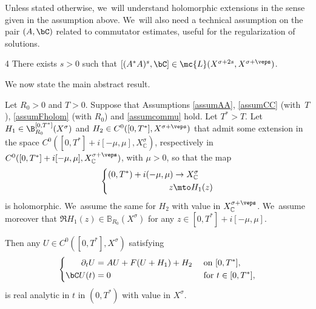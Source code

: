 Unless stated otherwise, we~will understand holomorphic extensions in the sense given in the assumption above. We~will also need a technical assumption on the pair $(A, \bC)$ related to commutator estimates, useful for the regularization of solutions.
\begin{assump}{4}
\label{assumcommu}
There exists $s>0$ such that $[(A^*A)^s,\bC]\in \mc{L}(X^{\sigma+2s}, X^{\sigma+\veps})$.
\end{assump}

We now state the main abstract result.

\begin{theorem}\label{thmabstractanalyticintro}
Let $R_{0}\!>\!0$ and $T\!>\!0$. Suppose that Assumptions \ref{assumAA}, \ref{assumCC} (with~$T$), \ref{assumFholom} (with $R_{0}$) and \ref{assumcommu} hold. Let $T^{*}\!>\!T$. Let $H_{1}\in \B_{R_{0}}^{[0,T^{*}]}(X^{\sigma})$ and $H_{2}\in C^{0}([0,T^{*}],X^{\sigma+\veps})$ that admit some extension in the space $C^{0}([0,T^{*}]+i[-\mu,\mu],X^{\sigma}_{\mathbb{C}})$, respectively in \hbox{$C^{0}([0,T^{*}]+i[-\mu,\mu],X^{\sigma+\veps}_{\mathbb{C}})$}, with $\mu\!>\!0$, so that the map
\begin{align*}
\left\{\begin{aligned}
(0,T^{*})+i(-\mu,\mu) & \to X^{\sigma}_{\mathbb{C}}\\
z&\mto H_{1}(z)
\end{aligned}\right.
\end{align*}
is holomorphic. We~assume the same for $H_{2}$ with value in $X^{\sigma+\veps}_{\mathbb{C}}$. We~assume moreover that $\Re H_{1}(z)\in \mathbb{B}_{R_0}(X^{\sigma})$ for any $z\in [0,T^{*}]+i[-\mu,\mu]$.

Then any $U\in C^{0}([0,T^{*}],X^{\sigma})$ satisfying
\begin{align}\label{UCabstractT*intro}
\left\{\begin{aligned}
\partial_t U&=AU+F(U+H_{1})+H_{2}&& \textnormal{ on } [0,T^{*}], \\
\bC U(t)&=0 &&\textnormal{ for }t\in [0,T^{*}],
\end{aligned}\right.
\end{align}
is real analytic in $t$ in $(0,T^*)$ with value in $X^{\sigma}$.
\end{theorem}
